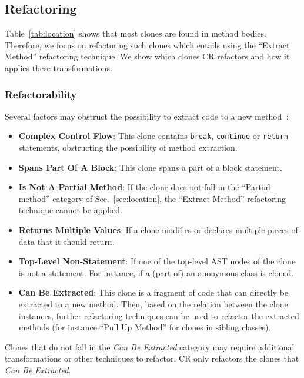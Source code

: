 \documentclass[sigconf,review,anonymous]{acmart}
\begin{document}
\subsection{Refactoring}\label{sec:refactoring}
Table~\ref{tab:location} shows that most clones are found in method bodies. Therefore, we focus on refactoring such clones which entails using the ``Extract Method'' refactoring technique. We show which clones CR refactors and how it applies these transformations.

\subsubsection{Refactorability} \label{sec:refactorability}
Several factors may obstruct the possibility to extract code to a new method~\cite{tsantalis2015assessing}:
\begin{itemize}
    \item \textbf{Complex Control Flow}: This clone contains \texttt{break}, \texttt{continue} or \texttt{return} statements, obstructing the possibility of method extraction.
    \item \textbf{Spans Part Of A Block}: This clone spans a part of a block statement.
    \item \textbf{Is Not A Partial Method}: If the clone does not fall in the ``Partial method'' category of Sec.~\ref{sec:location}, the ``Extract Method'' refactoring technique cannot be applied.
    \item \textbf{Returns Multiple Values}: If a clone modifies or declares multiple pieces of data that it should return.
    \item \textbf{Top-Level Non-Statement}: If one of the top-level AST nodes of the clone is not a statement. For instance, if a (part of) an anonymous class is cloned.
    \item \textbf{Can Be Extracted}: This clone is a fragment of code that can directly be extracted to a new method. Then, based on the relation between the clone instances, further refactoring techniques can be used to refactor the extracted methods (for instance ``Pull Up Method'' for clones in sibling classes).
\end{itemize}
Clones that do not fall in the \textit{Can Be Extracted} category may require additional transformations or other techniques to refactor. CR only refactors the clones that \textit{Can Be Extracted}.
\end{document}
